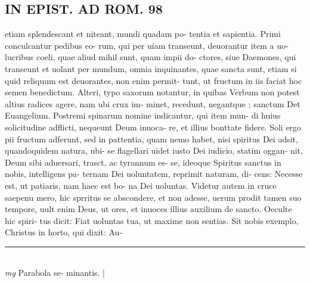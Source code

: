 \documentclass{article}
\begin{document}
\begin{pages}
\section*{IN EPIST. AD ROM.  98 }
\marginpar{[ p.]}\pstart etiam splendescant et niteant, mundi quadam po- tentia et sapientia. Primi conculcantur pedibus eo- rum, qui per uiam transeunt, deuorantur item a uo- lucribus coeli, quae aliud mihil sunt, quam impii do- ctores, siue Daemones, qui transeunt et uolant per mundum, omnia inquinantes, quae sancta sunt, etiam si quid reliquum est deuorantes, non enim permit- tunt, ut fructum in iis faciat hoc semen benedictum. Alteri, typo saxorum notantur, in quibas Verbum non potest altius radices agere, nam ubi crux im- minet, recedunt, negantque ; sanctum Det Euangelium. Postremi spinarum nomine indicantur, qui item mun- di huius solicitudine adflicti, nequeunt Deum inuoca- re, et illius bonttate fidere. Soli ergo pii fructum adferunt, sed in pattentia, quam nemo habet, nisi spiritus Dei adsit, quandoquidem natura, ubi- se flagellari uidet iusto Dei iudicio, statim oggan- nit, Deum sibi aduersari, trasct, ac tyrannum es- se, ideoque Spiritus sanctus in nobis, intelligens pa- ternam Dei uoluntatem, reprimit naturam, di- cens: Necesse est, ut patiaris, nam haec est bo- na Dei uoluntas. Videtur autem in cruce saepenu mero, hic sprritus se abscondere, et non adesse, uerum prodit tamen suo tempore, uult enim Deus, ut ores, et inuoces illius auxilium de sancto. Oeculte hic spiri- tus dicit: Fiat uoluntas tua, ut maxime non sentias.  Sit nobis exemplo, Christus in horto, qui dixit: Au-  \pend
\vspace{0.5cm}\noindent
\vspace{0.2cm}\rule{1cm}{0.2pt}\\ 
\hspace{0.2cm}\textit{mg}
\footnotesize Parabola se- minantis. 
\normalsize| 

\end{pages}
\end{document}
